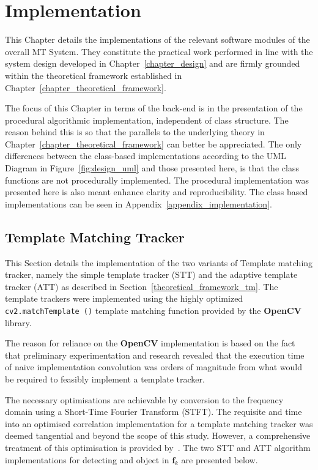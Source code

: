 \chapter{Implementation}\label{chapter_implementation}
This Chapter details the implementations of the relevant software modules of the
overall MT System. They constitute the practical work performed in line with the system design
developed in Chapter~\ref{chapter_design} and are firmly grounded within the theoretical framework
established in Chapter~\ref{chapter_theoretical_framework}.

The focus of this Chapter in terms of the back-end is in the presentation of the
procedural algorithmic implementation, independent of class structure. The
reason behind this is so that the parallels to the underlying theory in
Chapter~\ref{chapter_theoretical_framework} can better be appreciated.
The only differences between the class-based implementations according to the
UML Diagram in Figure~\ref{fig:design_uml} and those presented here, is that the
class functions are not procedurally implemented. The procedural implementation
was presented here is also meant enhance clarity and reproducibility. The class based
implementations can be seen in Appendix~\ref{appendix_implementation}.

\section{Template Matching Tracker}\label{implementation_tm}
This Section details the implementation of the two variants of Template matching
tracker, namely the simple template tracker (STT) and the adaptive template
tracker (ATT) as described in Section~\ref{theoretical_framework_tm}. The template trackers were
implemented using the highly optimized \lstinline{cv2.matchTemplate ()} template
matching function provided by the \textbf{OpenCV} library.  

The reason for reliance on the \textbf{OpenCV} implementation is based on the fact that
preliminary experimentation and research revealed that the execution time of
naive implementation convolution was orders of magnitude from what would be
required to feasibly implement a template tracker. 

The necessary optimisations are achievable by conversion to the frequency domain using a
Short-Time Fourier Transform (STFT). The requisite and time into an optimised
correlation implementation for a template matching tracker was deemed tangential
and beyond the scope of this study. However, a comprehensive treatment of this
optimisation is provided by~\cite{Usevitch2010}. The two STT and ATT algorithm
implementations for detecting and object in $\mathbf{f}_k$ are presented below.

